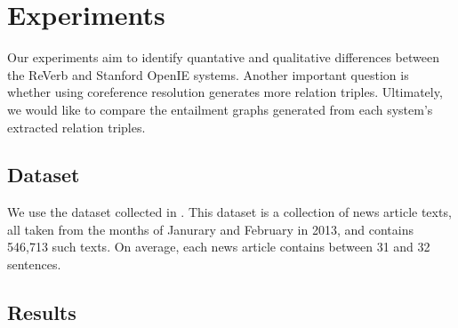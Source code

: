 \section{Experiments}

Our experiments aim to identify quantative and qualitative differences
between the ReVerb and Stanford OpenIE systems. Another important question
is whether using coreference resolution generates more relation triples. 
Ultimately, we would like to compare the entailment graphs generated from
each system's extracted relation triples. 

\subsection{Dataset}
We use the \newsspike{} dataset collected in \citet{zhang2013parallelparaphrase}.
This dataset is a collection of news article texts, all taken from the months of
Janurary and February in 2013, and contains 546,713 such texts. On average,
each news article contains between 31 and 32 sentences.

\subsection{Results}
 





